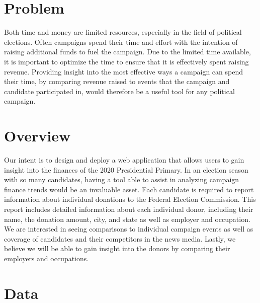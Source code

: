 \documentclass[12pt]{article}
\begin{document}
\section{Problem}

Both time and money are limited resources, especially in the field of political elections. Often campaigns spend their time and effort with the intention of raising additional funds to fuel the campaign. Due to the limited time available, it is important to optimize the time to ensure that it is effectively spent raising revenue. Providing insight into the most effective ways a campaign can spend their time, by comparing revenue raised to events that the campaign and candidate participated in, would therefore be a useful tool for any political campaign.

\section{Overview}

Our intent is to design and deploy a web application that allows users to gain insight into the finances of the 2020 Presidential Primary. In an election season with so many candidates, having a tool able to assist in analyzing campaign finance trends would be an invaluable asset. Each candidate is required to report information about individual donations to the Federal Election Commission. This report includes detailed information about each individual donor, including their name, the donation amount, city, and state as well as employer and occupation. We are interested in seeing comparisons to individual campaign events as well as coverage of candidates and their competitors in the news media. Lastly, we believe we will be able to gain insight into the donors by comparing their employers and occupations.

\section{Data}
\end{document}
